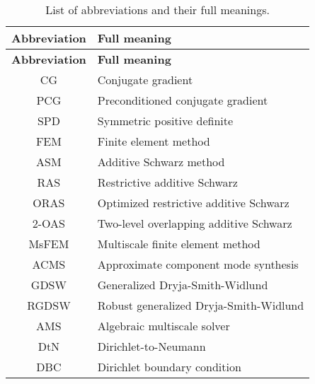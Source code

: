 \begin{longtable}{c p{10cm}}
    \caption{List of abbreviations and their full meanings.}\label{tab:abbreviations} \\
    \hline
    \textbf{Abbreviation} & \textbf{Full meaning}                                     \\
    \hline
    \endfirsthead

    \hline
    \textbf{Abbreviation} & \textbf{Full meaning}                                     \\
    \hline
    \endhead

    \hline
    \endfoot

    \hline
    \endlastfoot

    CG                    & Conjugate gradient                                        \\
    PCG                   & Preconditioned conjugate gradient                         \\
    SPD                   & Symmetric positive definite                               \\
    FEM                   & Finite element method                                     \\
    ASM                   & Additive Schwarz method                                   \\
    RAS                   & Restrictive additive Schwarz                              \\
    ORAS                  & Optimized restrictive additive Schwarz                    \\
    2-OAS                 & Two-level overlapping additive Schwarz                    \\
    MsFEM                 & Multiscale finite element method                          \\
    ACMS                  & Approximate component mode synthesis                      \\
    GDSW                  & Generalized Dryja-Smith-Widlund                           \\
    RGDSW                 & Robust generalized Dryja-Smith-Widlund                    \\
    AMS                   & Algebraic multiscale solver                               \\
    DtN                   & Dirichlet-to-Neumann                                      \\
    DBC                   & Dirichlet boundary condition                              \\

\end{longtable}
